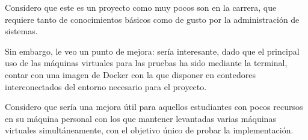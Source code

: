 Considero que este es un proyecto como muy pocos son en la carrera, que requiere tanto de conocimientos básicos como de gusto por la administración de sistemas.

Sin embargo, le veo un punto de mejora: sería interesante, dado que el principal uso de las máquinas virtuales para las pruebas ha sido mediante la terminal, contar con una imagen de Docker con la que disponer en contedores interconectados del entorno necesario para el proyecto. 

Considero que sería una mejora útil para aquellos estudiantes con pocos recursos en su máquina personal con los que mantener levantadas varias máquinas virtuales simultáneamente, con el objetivo único de probar la implementación.